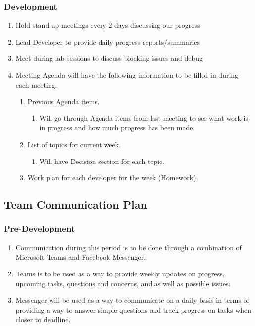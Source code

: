 \documentclass[11pt, oneside]{article}   	%
\begin{document}
\subsubsection*{Development}
\begin{enumerate}
\item Hold stand-up meetings every 2 days discussing our progress
\item Lead Developer to provide daily progress reports/summaries
\item Meet during lab sessions to discuss blocking issues and debug
\item Meeting Agenda will have the following information to be filled in during each meeting.

\begin{enumerate}
\item Previous Agenda items.
\begin{enumerate}
\item Will go through Agenda items from last meeting to see what work is in progress and how much progress has been made.
\end{enumerate}

\item List of topics for current week.
\begin{enumerate}
\item Will have Decision section for each topic.
\end{enumerate}

\item Work plan for each developer for the week (Homework).
\end{enumerate}
\end{enumerate}

\newpage
\subsection*{Team Communication Plan}
\subsubsection*{Pre-Development}
\begin{enumerate}
\item Communication during this period is to be done through a combination of Microsoft Teams and Facebook Messenger.
\item Teams is to be used as a way to provide weekly updates on progress, upcoming tasks, questions and concerns, and as well as possible issues.
\item Messenger will be used as a way to communicate on a daily basis in terms of providing a way to answer simple questions and track progress on tasks when closer to deadline.
\end{enumerate}
\end{document}
